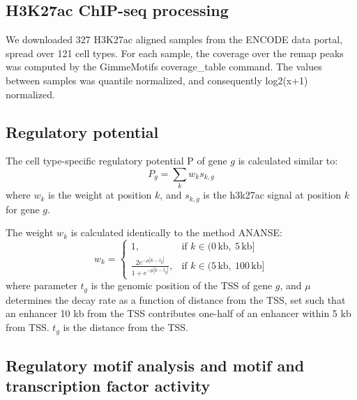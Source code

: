 \subsection{H3K27ac ChIP-seq processing}

We downloaded 327 H3K27ac aligned samples from the ENCODE data portal\cite{encode_dcc}, spread over 121 cell types. For each sample, the coverage over the remap peaks was computed by the GimmeMotifs coverage\_table command\cite{Bruse_2018}. The values between samples was quantile normalized\cite{qnorm}, and consequently log2(x+1) normalized.

\subsection{Regulatory potential}\label{section:regpotential}

The cell type-specific regulatory potential P of gene $g$ is calculated similar to\cite{Wang2016}:
\begin{equation*}
    P_g = \sum_k w_{k}s_{k,g}
\end{equation*}
where $w_k$ is the weight at position $k$, and $s_{k,g}$ is the h3k27ac signal at position $k$ for gene $g$.

\noindent
The weight $w_k$ is calculated identically to the method ANANSE\cite{Xu_2020}:
\begin{equation*}
    w_k = \begin{cases}
        1, & \text{if } k \in (0\,\text{kb},\ 5\,\text{kb}] \\
        \frac{2e^{-\mu|k-t_g|}}{1+e^{-\mu|k-t_g|}}, & \text{if } k \in (5\,\text{kb},\ 100\,\text{kb}]
    \end{cases}
\end{equation*}
where parameter $t_g$ is the genomic position of the TSS of gene $g$, and $\mu$ determines the decay rate as a function of distance from the TSS, set such that an enhancer 10 kb from the TSS contributes one-half of an enhancer within 5 kb from TSS. $t_g$ is the distance from the TSS.

\subsection{Regulatory motif analysis and motif and transcription factor activity}

